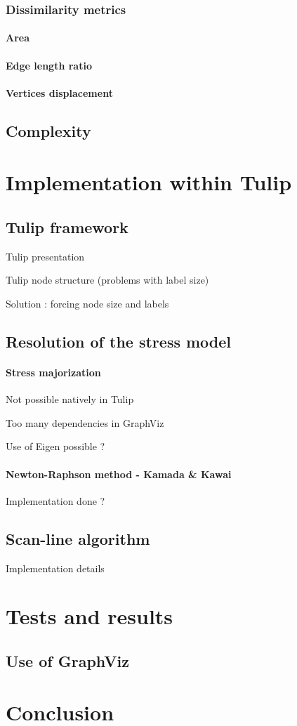 \documentclass[12pt]{report}
\begin{document}
\subsection{Dissimilarity metrics}

\subsubsection{Area}
\subsubsection{Edge length ratio}
\subsubsection{Vertices displacement}

\section{Complexity}

\chapter{Implementation within Tulip}

\section{Tulip framework}

Tulip presentation

Tulip node structure (problems with label size)

Solution : forcing node size and labels

\section{Resolution of the stress model}
\subsubsection{Stress majorization}
Not possible natively in Tulip

Too many dependencies in GraphViz

Use of Eigen possible ?
\subsubsection{Newton-Raphson method - Kamada \& Kawai}
Implementation done ?
\section{Scan-line algorithm}
Implementation details
\chapter{Tests and results}

\section{Use of GraphViz}

\chapter{Conclusion}



\end{document}
